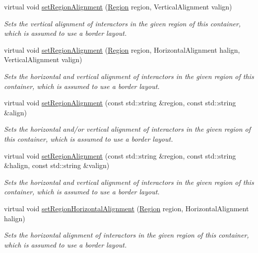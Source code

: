 \begin{DoxyCompactItemize}
virtual void \mbox{\hyperlink{classGContainer_a926942899d029fc9921fe770ac2867bb}{set\+Region\+Alignment}} (\mbox{\hyperlink{classGContainer_a81a01a86de31071a92e6cce0bab9bc4b}{Region}} region, Vertical\+Alignment valign)
\begin{DoxyCompactList}\small\item\em Sets the vertical alignment of interactors in the given region of this container, which is assumed to use a border layout. \end{DoxyCompactList}\item 
virtual void \mbox{\hyperlink{classGContainer_ab4d2bfcca7a18da2847e7b4494da4a16}{set\+Region\+Alignment}} (\mbox{\hyperlink{classGContainer_a81a01a86de31071a92e6cce0bab9bc4b}{Region}} region, Horizontal\+Alignment halign, Vertical\+Alignment valign)
\begin{DoxyCompactList}\small\item\em Sets the horizontal and vertical alignment of interactors in the given region of this container, which is assumed to use a border layout. \end{DoxyCompactList}\item 
virtual void \mbox{\hyperlink{classGContainer_ae4ff46516be9472498c0bf058b496e8b}{set\+Region\+Alignment}} (const std\+::string \&region, const std\+::string \&align)
\begin{DoxyCompactList}\small\item\em Sets the horizontal and/or vertical alignment of interactors in the given region of this container, which is assumed to use a border layout. \end{DoxyCompactList}\item 
virtual void \mbox{\hyperlink{classGContainer_ad1c76be81b3b865f78b0e91f0e1f07d4}{set\+Region\+Alignment}} (const std\+::string \&region, const std\+::string \&halign, const std\+::string \&valign)
\begin{DoxyCompactList}\small\item\em Sets the horizontal and vertical alignment of interactors in the given region of this container, which is assumed to use a border layout. \end{DoxyCompactList}\item 
virtual void \mbox{\hyperlink{classGContainer_aca8f01ef261afca9c843589e8be54134}{set\+Region\+Horizontal\+Alignment}} (\mbox{\hyperlink{classGContainer_a81a01a86de31071a92e6cce0bab9bc4b}{Region}} region, Horizontal\+Alignment halign)
\begin{DoxyCompactList}\small\item\em Sets the horizontal alignment of interactors in the given region of this container, which is assumed to use a border layout. \end{DoxyCompactList}\item 

\end{DoxyCompactItemize}
